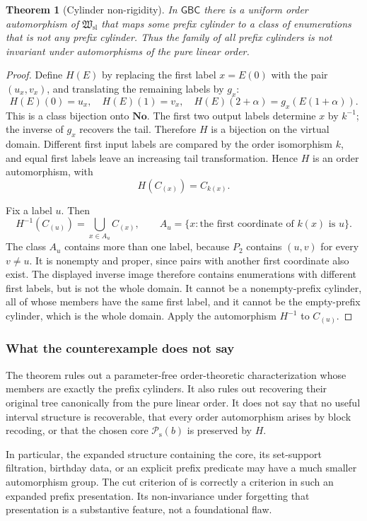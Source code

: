 \documentclass[11pt]{article}
\newtheorem{theorem}{Theorem}[section]
\theoremstyle{definition}
\theoremstyle{remark}
\newcommand{\No}{\mathbf{No}}
\newcommand{\Hsl}{\mathfrak W_{\mathrm{sl}}}
\newcommand{\Psupp}{\mathcal P_{\mathrm{s}}}
\newcommand{\GBC}{\mathsf{GBC}}
\begin{document}
\begin{theorem}[Cylinder non-rigidity]\label{swo:fs:thm:nonrigidity}
In $\GBC$ there is a uniform order automorphism of $\Hsl$ that maps
some prefix cylinder to a class of enumerations that is not any prefix
cylinder. Thus the family of all prefix cylinders is not invariant
under automorphisms of the pure linear order.
\end{theorem}
\begin{proof}
Define $H(E)$ by replacing the first label $x=E(0)$ with the pair
$(u_x,v_x)$, and translating the remaining labels by $g_x$:
\[
 H(E)(0)=u_x,\quad H(E)(1)=v_x,\quad
 H(E)(2+\alpha)=g_x(E(1+\alpha)).
\]
This is a class bijection onto $\No$. The first two output labels
determine $x$ by $k^{-1}$; the inverse of $g_x$ recovers the tail.
Therefore $H$ is a bijection on the virtual domain. Different first
input labels are compared by the order isomorphism $k$, and equal
first labels leave an increasing tail transformation. Hence $H$ is
an order automorphism, with
\[
                              H(C_{(x)})=C_{k(x)}.
\]

Fix a label $u$. Then
\[
 H^{-1}(C_{(u)})=
       \bigcup_{x\in A_u} C_{(x)},\qquad
 A_u=\{x:\text{the first coordinate of }k(x)\text{ is }u\}.
\]
The class $A_u$ contains more than one label, because $P_2$ contains
$(u,v)$ for every $v\ne u$. It is nonempty and proper, since pairs
with another first coordinate also exist. The displayed inverse image
therefore contains enumerations with different first labels, but is
not the whole domain. It cannot be a nonempty-prefix cylinder, all of
whose members have the same first label, and it cannot be the
empty-prefix cylinder, which is the whole domain. Apply the
automorphism $H^{-1}$ to $C_{(u)}$.
\end{proof}

\subsubsection{What the counterexample does not say}

The theorem rules out a parameter-free order-theoretic characterization
whose members are exactly the prefix cylinders. It also rules out
recovering their original tree canonically from the pure linear order.
It does not say that no useful interval structure is recoverable, that
every order automorphism arises by block recoding, or that the chosen
core $\Psupp(b)$ is preserved by $H$.

In particular, the expanded structure containing the core, its
set-support filtration, birthday data, or an explicit prefix predicate
may have a much smaller automorphism group. The cut criterion of
 is correctly a criterion in such
an expanded prefix presentation. Its non-invariance under forgetting
that presentation is a substantive feature, not a foundational flaw.
\end{document}
